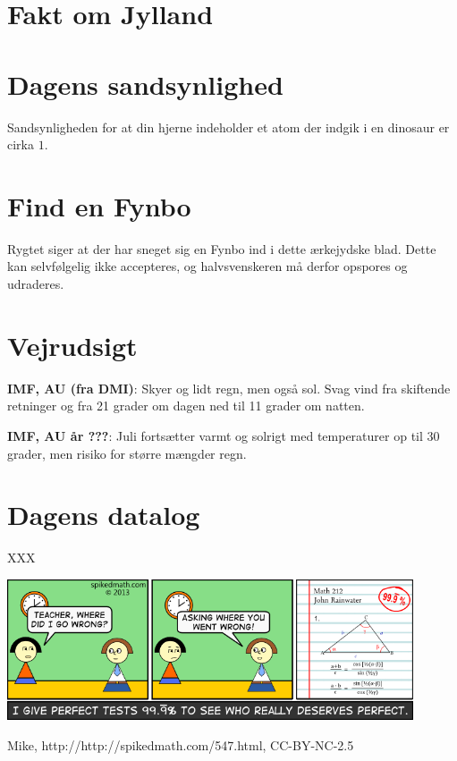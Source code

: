 \documentclass[article,10pt,a4,oneside]{memoir}
\begin{document}
\begin{minipage}[b]{0.95\textwidth}
\begin{minipage}[t]{0.47\textwidth}
\vspace{1mm}
\section*{Fakt om Jylland}


\section*{Dagens sandsynlighed}
Sandsynligheden for at din hjerne indeholder et atom der indgik i en dinosaur er cirka $1$.

\section*{Find en Fynbo}
Rygtet siger at der har sneget sig en Fynbo ind i dette ærkejydske blad. Dette kan selvfølgelig ikke accepteres, og halvsvenskeren må derfor opspores og udraderes.

\end{minipage}%
\hfill\begin{minipage}[t]{0.47\textwidth}
\vspace{1mm}
\section*{Vejrudsigt}
\textbf{IMF, AU (fra DMI)}: Skyer og lidt regn, men også sol. Svag vind fra skiftende retninger og fra 21 grader om dagen ned til 11 grader om natten.

\textbf{IMF, AU år ???}: Juli fortsætter varmt og solrigt med temperaturer op til 30 grader, men risiko for større mængder regn.

\section*{Dagens datalog}
XXX
\end{minipage}

\includegraphics[width=0.9\textwidth]{547-the-perfect-score.png}
\begin{center}
\tiny Mike, http://http://spikedmath.com/547.html, CC-BY-NC-2.5
\end{center}
\end{minipage}
\end{document}
